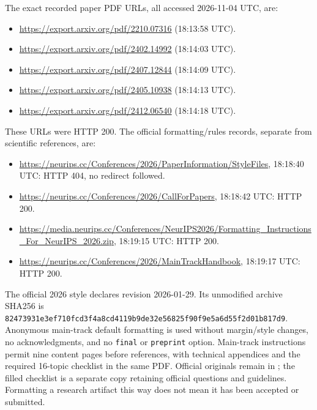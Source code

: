 \documentclass{article}
\DeclareRobustCommand{\artifact}[1]{\path{#1}}
\begin{document}
The exact recorded paper PDF URLs, all accessed 2026-11-04 UTC, are:
\begin{itemize}
\item \url{https://export.arxiv.org/pdf/2210.07316} (18:13:58 UTC).
\item \url{https://export.arxiv.org/pdf/2402.14992} (18:14:03 UTC).
\item \url{https://export.arxiv.org/pdf/2407.12844} (18:14:09 UTC).
\item \url{https://export.arxiv.org/pdf/2405.10938} (18:14:13 UTC).
\item \url{https://export.arxiv.org/pdf/2412.06540} (18:14:18 UTC).
\end{itemize}
These URLs were HTTP 200. The official formatting/rules records, separate from scientific references, are:
\begin{itemize}
\item \url{https://neurips.cc/Conferences/2026/PaperInformation/StyleFiles}, 18:18:40 UTC: HTTP 404, no redirect followed.
\item \url{https://neurips.cc/Conferences/2026/CallForPapers}, 18:18:42 UTC: HTTP 200.
\item \url{https://media.neurips.cc/Conferences/NeurIPS2026/Formatting_Instructions_For_NeurIPS_2026.zip}, 18:19:15 UTC: HTTP 200.
\item \url{https://neurips.cc/Conferences/2026/MainTrackHandbook}, 18:19:17 UTC: HTTP 200.
\end{itemize}
The official 2026 style declares revision 2026-01-29. Its unmodified archive SHA256 is \texttt{82473931e3ef710fcd3f4a8cd4119b9de32e56825f90f9e5a6d55f2d01b817d9}. Anonymous main-track default formatting is used without margin/style changes, no acknowledgments, and no \texttt{final} or \texttt{preprint} option. Main-track instructions permit nine content pages before references, with technical appendices and the required 16-topic checklist in the same PDF. Official originals remain in \artifact{paper/neurips2026/}; the filled checklist is a separate copy retaining official questions and guidelines. Formatting a research artifact this way does not mean it has been accepted or submitted.

\clearpage

\end{document}
